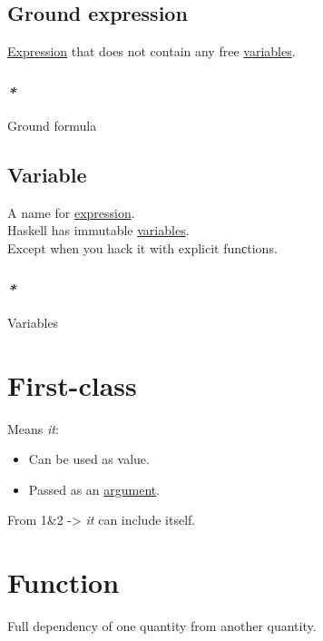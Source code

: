 \documentclass[a4paper,14pt,oneside]{book}
\begin{document}
\section{\label{org392d2c1}Ground expression}
\label{sec:org7056887}
\hyperref[orgade06d7]{Expression} that does not contain any free \hyperref[org0f938c0]{variables}.\\

\subsection{\emph{*}}
\label{sec:org39b040f}

\label{org1d70bec}Ground formula\\

\section{\label{org2a8e721}Variable}
\label{sec:orga153400}
A name for \hyperref[orgade06d7]{expression}.\\

Haskell has immutable \hyperref[org0f938c0]{variables}.\\
Except when you hack it with explicit funсtions.\\

\subsection{\emph{*}}
\label{sec:orgaaaa645}

\label{org0f938c0}Variables\\

\chapter{\label{org4249736}First-class}
\label{sec:orgbdee16c}
Means \emph{it}:\\
\begin{itemize}
\item Can be used as value.\\
\item Passed as an \hyperref[org86f3f7b]{argument}.\\
\end{itemize}
From 1\&2 -> \emph{it} can include itself.\\

\chapter{\label{org9530a6b}Function}
\label{sec:org0b3094e}
Full dependency of one quantity from another quantity.\\
\end{document}
